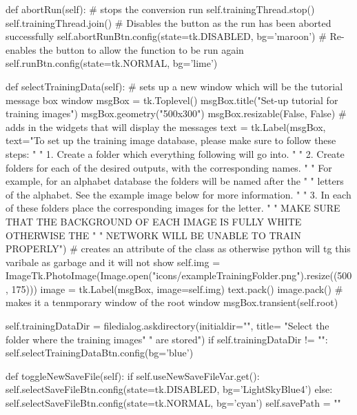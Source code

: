 \documentclass{report}
\begin{document}
\begin{python}
    def abortRun(self):
        # stops the conversion run
        self.trainingThread.stop()
        self.trainingThread.join()
        # Disables the button as the run has been aborted successfully
        self.abortRunBtn.config(state=tk.DISABLED, bg='maroon')
        # Re-enables the button to allow the function to be run again
        self.runBtn.config(state=tk.NORMAL, bg='lime')

    def selectTrainingData(self):
        # sets up a new window which will be the tutorial message box window
        msgBox = tk.Toplevel()
        msgBox.title("Set-up tutorial for training images")
        msgBox.geometry("500x300")
        msgBox.resizable(False, False)
        # adds in the widgets that will display the messages
        text = tk.Label(msgBox, text="To set up the training image database, please make sure to follow these steps: \n"
                        "  1. Create a folder which everything following will go into. \n"
                        "  2. Create folders for each of the desired outputs, with the corresponding names. \n"
                        "     For example, for an alphabet database the folders will be named after the \n"
                        "     letters of the alphabet. See the example image below for more information. \n"
                        "  3. In each of these folders place the corresponding images for the letter. \n"
                        "     MAKE SURE THAT THE BACKGROUND OF EACH IMAGE IS FULLY WHITE OTHERWISE THE \n"
                        "     NETWORK WILL BE UNABLE TO TRAIN PROPERLY")
        # creates an attribute of the class as otherwise python will tg this varibale as garbage and it will not show
        self.img = ImageTk.PhotoImage(Image.open("icons/exampleTrainingFolder.png").resize((500, 175)))
        image = tk.Label(msgBox, image=self.img)
        text.pack()
        image.pack()
        # makes it a tenmporary window of the root window
        msgBox.transient(self.root)

        self.trainingDataDir = filedialog.askdirectory(initialdir="", title=
                                "Select the folder where the training images"
                                " are stored")
        if self.trainingDataDir != "":
            self.selectTrainingDataBtn.config(bg='blue')

    def toggleNewSaveFile(self):
        if self.useNewSaveFileVar.get():
            self.selectSaveFileBtn.config(state=tk.DISABLED, bg='LightSkyBlue4')
        else:
            self.selectSaveFileBtn.config(state=tk.NORMAL, bg='cyan')
            self.savePath = ""


\end{python}
\end{document}

